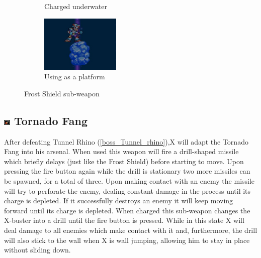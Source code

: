 \begin{figure}[htp]
\begin{subfigure}{3.9cm}
		\caption{Charged underwater }	
	\end{subfigure}
	\begin{subfigure}{3.9cm}
		\centering
		\includegraphics[height=2.7cm]{figures/X3/weapons/F_shield_C_3.png}
		\caption{Using as a platform}	
	\end{subfigure}
	\caption{Frost Shield sub-weapon}
\end{figure}

\subsection{\includegraphics[width=12px, height=10px]{figures/X3/weapons/T_fang.jpg} Tornado Fang}\label{Tornado_Fang}
After defeating Tunnel Rhino (\ref{boss_Tunnel_rhino}),X will adapt the Tornado Fang into his arsenal. When used this weapon will fire a drill-shaped missile which briefly delays (just like the Frost Shield) before starting to move. Upon pressing the fire button again while the drill is stationary two more missiles can be spawned, for a total of three. Upon making contact with an enemy the missile will try to perforate the enemy, dealing constant damage in the process until its charge is depleted. If it successfully destroys an enemy it will keep moving forward until its charge is depleted. When charged this sub-weapon changes the X-buster into a drill until the fire button is pressed. While in this state X will deal damage to all enemies which make contact with it and, furthermore, the drill will also stick to the wall when X is wall jumping, allowing him to stay in place without sliding down.

